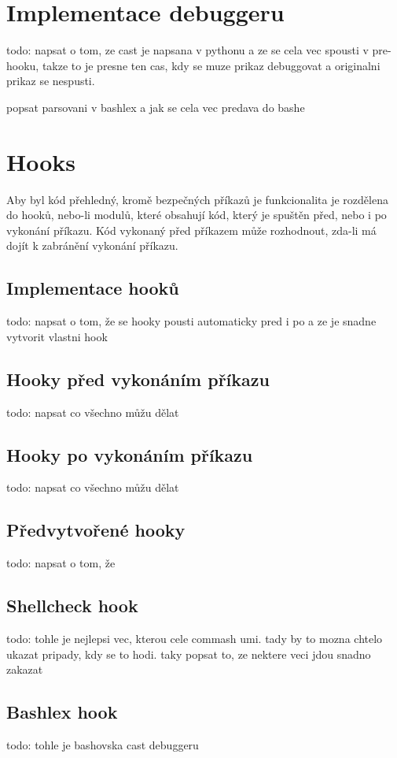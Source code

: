 \documentclass[thesis=M,czech]{FITthesis}[2012/06/26]
\begin{document}
%
%
%
%
%
\section{Implementace debuggeru}
todo: napsat o tom, ze cast je napsana v pythonu a ze se cela vec spousti v pre-hooku, takze to je presne ten cas, kdy se muze prikaz debuggovat a originalni prikaz se nespusti.

popsat parsovani v bashlex a jak se cela vec predava do bashe

%
%
%
%
%
\section{Hooks}
Aby byl kód přehledný, kromě bezpečných příkazů je funkcionalita je rozdělena do hooků, nebo-li modulů, které obsahují kód, který je spuštěn před, nebo i po vykonání příkazu. Kód vykonaný před příkazem může rozhodnout, zda-li má dojít k zabránění vykonání příkazu.


\subsection{Implementace hooků}
todo: napsat o tom, že se hooky pousti automaticky pred i po a ze je snadne vytvorit vlastni hook

\subsection{Hooky před vykonáním příkazu}
todo: napsat co všechno můžu dělat

\subsection{Hooky po vykonáním příkazu}
todo: napsat co všechno můžu dělat

\subsection{Předvytvořené hooky}
todo: napsat o tom, že 

\subsection{Shellcheck hook}
todo: tohle je nejlepsi vec, kterou cele commash umi. tady by to mozna chtelo ukazat pripady, kdy se to hodi. taky popsat to, ze nektere veci jdou snadno zakazat

\subsection{Bashlex hook}
todo: tohle je bashovska cast debuggeru
\end{document}
